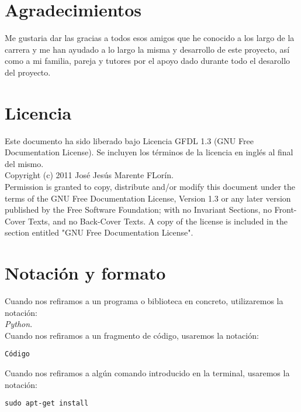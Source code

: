 

\section*{Agradecimientos}

Me gustaria dar las gracias a todos esos amigos que he conocido a los largo de la carrera y me han ayudado
a lo largo la misma y desarrollo de este proyecto, así como a mi familia, pareja y tutores por el apoyo 
dado durante todo el desarollo del proyecto.

\cleardoublepage

\section*{Licencia} %

Este documento ha sido liberado bajo Licencia GFDL 1.3 (GNU Free
Documentation License). Se incluyen los términos de la licencia en
inglés al final del mismo.\\

Copyright (c) 2011 José Jesús Marente FLorín.\\

Permission is granted to copy, distribute and/or modify this document under the
terms of the GNU Free Documentation License, Version 1.3 or any later version
published by the Free Software Foundation; with no Invariant Sections, no
Front-Cover Texts, and no Back-Cover Texts. A copy of the license is included in
the section entitled "GNU Free Documentation License".\\

\cleardoublepage

\section*{Notación y formato}

Cuando nos refiramos a un programa o biblioteca en concreto, utilizaremos la
notación:\\

\emph{Python}.\\

Cuando nos refiramos a un fragmento de código, usaremos la notación:
\begin{verbatim} 
Código 
\end{verbatim}

Cuando nos refiramos a algún comando introducido en la terminal, usaremos la notación:

\begin{lstlisting}[style=consola, numbers=none]
sudo apt-get install
\end{lstlisting}
